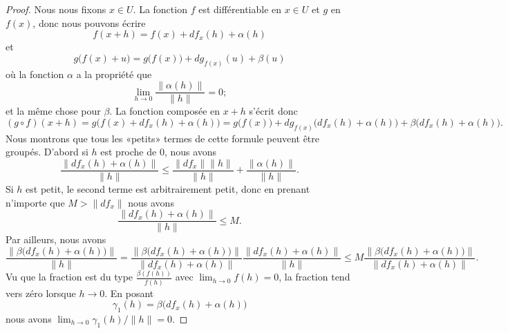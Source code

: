 \begin{proof}
    Nous nous fixons \( x\in U\). La fonction \( f\) est différentiable en \( x\in U\) et \( g\) en \( f(x)\), donc nous pouvons écrire
    \begin{equation}
        f(x+h)=f(x)+df_x(h)+\alpha(h)
    \end{equation}
    et
    \begin{equation}
        g\big( f(x)+u \big)=g\big( f(x) \big)+dg_{f(x)}(u)+\beta(u)
    \end{equation}
    où la fonction \( \alpha\) a la propriété que
    \begin{equation}
        \lim_{h\to 0} \frac{ \| \alpha(h) \| }{ \| h \| }=0;
    \end{equation}
    et la même chose pour \( \beta\). La fonction composée en \( x+h\) s'écrit donc
    \begin{equation}    \label{EqCXcfhfH}
        (g\circ f)(x+h)=g\big( f(x)+df_x(h)+\alpha(h) \big)=g\big( f(x) \big)+dg_{f(x)}\big( df_x(h)+\alpha(h) \big)+\beta\big( df_x(h)+\alpha(h) \big).
    \end{equation}
    Nous montrons que tous les «petits» termes de cette formule peuvent être groupés. D'abord si \( h\) est proche de \( 0\), nous avons
    \begin{equation}
        \frac{ \| df_x(h)+\alpha(h) \| }{ \| h \| }\leq\frac{ \| df_x \|\| h \| }{ \| h \| }+\frac{ \| \alpha(h) \| }{ \| h \| }.
    \end{equation}
    Si \( h\) est petit, le second terme est arbitrairement petit, donc en prenant n'importe que \( M>\| df_x \|\) nous avons
    \begin{equation}
        \frac{ \| df_x(h)+\alpha(h) \| }{ \| h \| }\leq M.
    \end{equation}
    Par ailleurs, nous avons
    \begin{equation}
        \frac{ \| \beta\big( df_x(h)+\alpha(h) \big) \| }{ \| h \| }=\frac{  \| \beta\big( df_x(h)+\alpha(h) \big) \|  }{ \| df_x(h)+\alpha(h) \| }\frac{  \| df_x(h)+\alpha(h) \|  }{ \| h \| }\leq M\frac{  \| \beta\big( df_x(h)+\alpha(h) \big) \|  }{   \| df_x(h)+\alpha(h) \| }.
    \end{equation}
    Vu que la fraction est du type \( \frac{ \beta( f(h)) }{ f(h) }\) avec \( \lim_{h\to 0} f(h)=0\), la fraction tend vers zéro lorsque \( h\to 0\). En posant
    \begin{equation}
        \gamma_1(h)=\beta\big( df_x(h)+\alpha(h) \big)
    \end{equation}
    nous avons \( \lim_{h\to 0} \gamma_1(h)/\| h \|=0\).


\end{proof}
